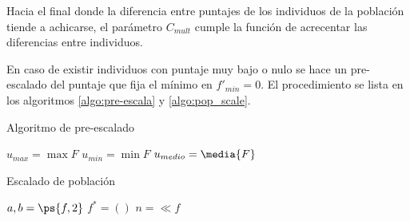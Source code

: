 Hacia el final donde la diferencia entre puntajes de los individuos de la
población tiende a achicarse, el parámetro $C_{mult}$ cumple la función de
acrecentar las diferencias entre individuos.

En caso de existir individuos con puntaje muy bajo o nulo se hace un
pre-escalado del puntaje que fija el mínimo en $f'_{min}=0$.
%
El procedimiento se lista en los algoritmos \ref{algo:pre-escala} y
\ref{algo:pop_scale}.


\begin{algorithm} \caption{Algoritmo de pre-escalado}\label{algo:pre-escala}
  \BlankLine

  $u_{max} = \max{F}$\;
  $u_{min} = \min{F}$\;
  $u_{medio} = \media{F}$\;
\end{algorithm}


\begin{algorithm}\caption{Escalado de población}\label{algo:pop_scale}
  \BlankLine

  $a, b = \ps{f, 2}$\;
  $f^{*} = ()$ \;
  $n = \ll{f}$\;
  \;
\end{algorithm}

